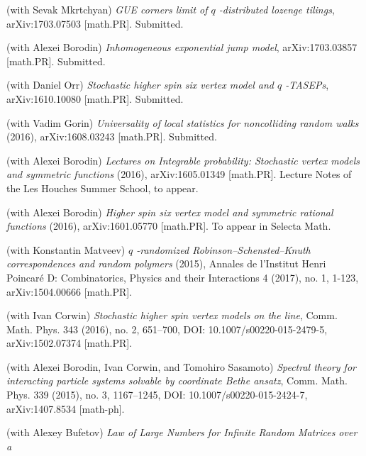 \documentclass[letterpaper,11pt]{article}
\begin{document}
\begin{etaremune}
	\renewcommand{\labelenumi}{[\theenumi]}
	\item
	      (with Sevak Mkrtchyan)
	      \emph{GUE corners limit of
		      $q$%
		      -distributed lozenge tilings}, arXiv:1703.07503 [math.PR]. Submitted.
	\item
	      (with Alexei Borodin)
	      \emph{Inhomogeneous exponential jump model},
	      arXiv:1703.03857 [math.PR]. Submitted.
	\item
	      (with Daniel Orr)
	      \emph{Stochastic higher spin six vertex model and
		      $q$%
		      -TASEPs},
	      arXiv:1610.10080 [math.PR]. Submitted.
	\item
	      (with Vadim Gorin)
	      \emph{Universality of local statistics for noncolliding random
		      walks}
	      (2016),
	      arXiv:1608.03243 [math.PR]. Submitted.
	\item
	      (with Alexei Borodin)
	      \emph{Lectures on Integrable probability: Stochastic vertex
		      models and
		      symmetric functions}
	      (2016), arXiv:1605.01349 [math.PR]. Lecture Notes of the Les
	      Houches
	      Summer School, to appear.
	\item
	      (with Alexei Borodin)
	      \emph{Higher spin six vertex model and symmetric rational
		      functions}
	      (2016),
	      arXiv:1601.05770 [math.PR]. To appear in Selecta Math.
	\item
	      (with Konstantin Matveev)
	      \emph{$q$%
		      -randomized Robinson--Schensted--Knuth correspondences
		      and random
		      polymers}
	      (2015),
	      Annales de l'Institut Henri Poincar\'e D:
	      Combinatorics, Physics and their Interactions
	      4 (2017), no. 1, 1-123,
	      arXiv:1504.00666 [math.PR].
	\item
	      (with Ivan Corwin)
	      \emph{Stochastic higher spin vertex models on the line},
	      Comm. Math. Phys.
	      343 (2016), no. 2,
	      651--700,
	      DOI: 10.1007/s00220-015-2479-5,
	      arXiv:1502.07374 [math.PR].
	\item
	      (with Alexei Borodin, Ivan Corwin, and Tomohiro Sasamoto)
	      \emph{Spectral theory for interacting particle systems solvable
		      by
		      coordinate Bethe ansatz},
	      Comm. Math. Phys.
	      339 (2015), no. 3,
	      1167--1245,
	      DOI: 10.1007/s00220-015-2424-7,
	      arXiv:1407.8534 [math-ph].
	\item
	      (with Alexey Bufetov)
	      \emph{Law of Large Numbers for Infinite Random Matrices over a
}
\end{etaremune}
\end{document}
